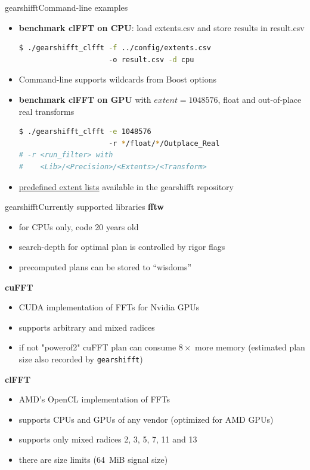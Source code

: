 \documentclass[t,11pt,hyperref={
  pdftitle = {gearshifft},
  pdfsubject = {gearshifft},
  pdfborder={0 0 0},
  colorlinks=true,
  urlcolor=red,
  citecolor=red,
  linkcolor=red,
  pdfauthor={Peter Steinbach, Matthias Werner}
  }
]{beamer}
\newcommand{\gearshifft}{\texttt{gearshifft}}
\begin{document}
\begin{frame}[fragile]{gearshifft}{Command-line examples}
  \begin{itemize}[<+->]
\item 
\textbf{benchmark clFFT on CPU}: load extents.csv and store results in result.csv
\begin{lstlisting}[numbers=none,language=bash,basicstyle=\small\ttfamily,columns=fixed]
$ ./gearshifft_clfft -f ../config/extents.csv
                     -o result.csv -d cpu
\end{lstlisting}

\item Command-line supports wildcards from Boost options
\item 
\textbf{benchmark clFFT on GPU} with $extent=1048576$, float and out-of-place real transforms
\begin{lstlisting}[numbers=none,language=bash,basicstyle=\small\ttfamily,columns=fixed]
$ ./gearshifft_clfft -e 1048576
                     -r */float/*/Outplace_Real
# -r <run_filter> with 
#    <Lib>/<Precision>/<Extents>/<Transform>
\end{lstlisting}
\item \href{https://github.com/mpicbg-scicomp/gearshifft/tree/master/config}{predefined extent lists} available in the gearshifft repository
\end{itemize}  
\end{frame}


\begin{frame}{gearshifft}{Currently supported libraries}
  {\textbf{fftw}}
  \begin{itemize}
  \item for CPUs only, code 20 years old
  \item search-depth for optimal plan is controlled by rigor flags
  \item precomputed plans can be stored to ``wisdoms''
  \end{itemize}
\pause  
  {\textbf{cuFFT}} 
  \begin{itemize}
  \item CUDA implementation of FFTs for Nvidia GPUs
  \item supports arbitrary and mixed radices
  \item if not "powerof2" cuFFT plan can consume $8\times$ more memory (estimated plan size also recorded by \gearshifft{}) %
  \end{itemize}
\pause
  {\textbf{clFFT}}
  \begin{itemize}
  \item AMD's OpenCL implementation of FFTs
  \item supports CPUs and GPUs of any vendor (optimized for AMD GPUs)
  \item supports only mixed radices 2, 3, 5, 7, 11 and 13
  \item there are size limits (\SI{64}{MiB} signal size)
  \end{itemize}
  
\end{frame}
\end{document}

